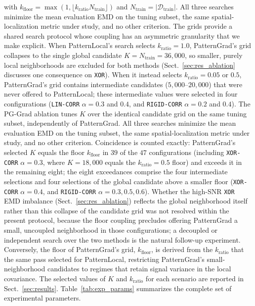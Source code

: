 \documentclass[pdflatex,sn-mathphys-num]{sn-jnl}
\theoremstyle{thmstyleone}
\theoremstyle{thmstyletwo}%
\theoremstyle{thmstylethree}%
\begin{document}
with $k_{\text{floor}} = \max(1, \lfloor k_{\text{ratio}} N_{\text{train}} \rfloor)$ and $N_{\text{train}} = |\mathcal{D}_{\text{train}}|$. All three searches minimize the mean evaluation EMD on the tuning subset, the same spatial-localization metric under study, and no other criterion. The grids provide a shared search protocol whose coupling has an asymmetric granularity that we make explicit. When PatternLocal's search selects $k_{\text{ratio}} = 1.0$, PatternGrad's grid collapses to the single global candidate $K = N_{\text{train}} = 36{,}000$, so smaller, purely local neighborhoods are excluded for both methods (Sect.~\ref{sec:res_ablation} discusses one consequence on \texttt{XOR}). When it instead selects $k_{\text{ratio}} = 0.05$ or $0.5$, PatternGrad's grid contains intermediate candidates ($5{,}000$--$20{,}000$) that were never offered to PatternLocal; these intermediate values were selected in four configurations (\texttt{LIN-CORR} $\alpha = 0.3$ and $0.4$, and \texttt{RIGID-CORR} $\alpha = 0.2$ and $0.4$). The PG-Grad ablation tunes $K$ over the identical candidate grid on the same tuning subset, independently of PatternGrad. All three searches minimize the mean evaluation EMD on the tuning subset, the same spatial-localization metric under study, and no other criterion. Coincidence is counted exactly: PatternGrad's selected $K$ equals the floor $k_{\text{floor}}$ in $39$ of the $47$ configurations (including \texttt{XOR-CORR} $\alpha = 0.3$, where $K = 18{,}000$ equals the $k_{\text{ratio}} = 0.5$ floor) and exceeds it in the remaining eight; the eight exceedances comprise the four intermediate selections and four selections of the global candidate above a smaller floor (\texttt{XOR-CORR} $\alpha = 0.4$, and \texttt{RIGID-CORR} $\alpha = 0.3, 0.5, 0.6$). Whether the high-SNR \texttt{XOR} EMD imbalance (Sect.~\ref{sec:res_ablation}) reflects the global neighborhood itself rather than this collapse of the candidate grid was not resolved within the present protocol, because the floor coupling precludes offering PatternGrad a small, uncoupled neighborhood in those configurations; a decoupled or independent search over the two methods is the natural follow-up experiment. Conversely, the floor of PatternGrad's grid, $k_{\text{floor}}$, is derived from the $k_{\text{ratio}}$ that the same pass selected for PatternLocal, restricting PatternGrad's small-neighborhood candidates to regimes that retain signal variance in the local covariance. The selected values of $K$ and $k_{\text{ratio}}$ for each scenario are reported in Sect.~\ref{sec:results}. Table~\ref{tab:exp_params} summarizes the complete set of experimental parameters.
\end{document}
